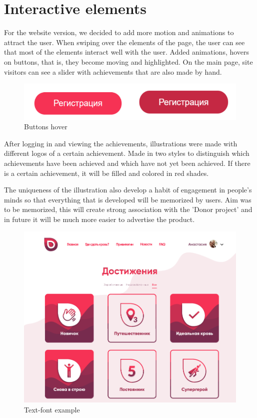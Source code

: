 \section{Interactive elements}
For the website version, we decided to add more motion and animations to attract the user. When swiping over the elements of the page, the user can see that most of the elements interact well with the user. Added animations, hovers on buttons, that is, they become moving and highlighted. On the main page, site visitors can see a slider with achievements that are also made by hand.
\begin{figure}[h]
    \centering
    \includegraphics[scale=0.5]{figures/10.png}
    \caption{Buttons hover}
    \label{fig:buttons}
\end{figure}
\par
After logging in and viewing the achievements, illustrations were made with different logos of a certain achievement. Made in two styles to distinguish which achievements have been achieved and which have not yet been achieved. If there is a certain achievement, it will be filled and colored in red shades. 
\par
The uniqueness of the illustration also develop a habit of engagement in people's minds so that everything that is developed will be memorized by users. Aim was to be memorized, this will create strong association with the 'Donor project' and in future it will be much more easier to advertise the product.
\begin{figure}[h]
    \centering
    \includegraphics[scale=0.45]{figures/11.png}
    \caption{Text-font example}
    \label{fig:interactive}
\end{figure}




